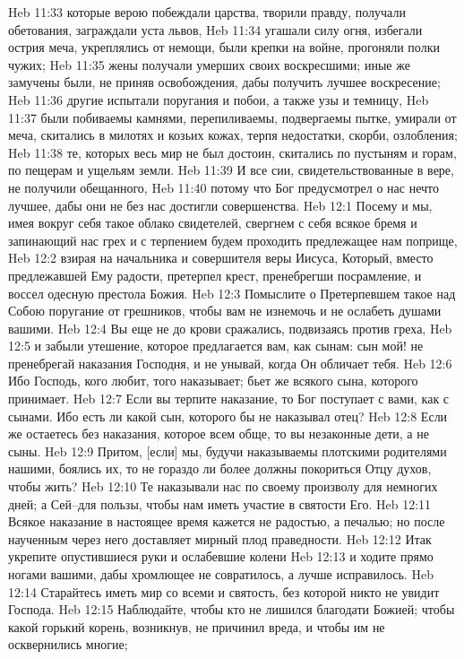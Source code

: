 Heb 11:33  которые верою побеждали царства, творили правду, получали обетования, заграждали уста львов,
Heb 11:34  угашали силу огня, избегали острия меча, укреплялись от немощи, были крепки на войне, прогоняли полки чужих;
Heb 11:35  жены получали умерших своих воскресшими; иные же замучены были, не приняв освобождения, дабы получить лучшее воскресение;
Heb 11:36  другие испытали поругания и побои, а также узы и темницу,
Heb 11:37  были побиваемы камнями, перепиливаемы, подвергаемы пытке, умирали от меча, скитались в милотях и козьих кожах, терпя недостатки, скорби, озлобления;
Heb 11:38  те, которых весь мир не был достоин, скитались по пустыням и горам, по пещерам и ущельям земли.
Heb 11:39  И все сии, свидетельствованные в вере, не получили обещанного,
Heb 11:40  потому что Бог предусмотрел о нас нечто лучшее, дабы они не без нас достигли совершенства.
Heb 12:1  Посему и мы, имея вокруг себя такое облако свидетелей, свергнем с себя всякое бремя и запинающий нас грех и с терпением будем проходить предлежащее нам поприще,
Heb 12:2  взирая на начальника и совершителя веры Иисуса, Который, вместо предлежавшей Ему радости, претерпел крест, пренебрегши посрамление, и воссел одесную престола Божия.
Heb 12:3  Помыслите о Претерпевшем такое над Собою поругание от грешников, чтобы вам не изнемочь и не ослабеть душами вашими.
Heb 12:4  Вы еще не до крови сражались, подвизаясь против греха,
Heb 12:5  и забыли утешение, которое предлагается вам, как сынам: сын мой! не пренебрегай наказания Господня, и не унывай, когда Он обличает тебя.
Heb 12:6  Ибо Господь, кого любит, того наказывает; бьет же всякого сына, которого принимает.
Heb 12:7  Если вы терпите наказание, то Бог поступает с вами, как с сынами. Ибо есть ли какой сын, которого бы не наказывал отец?
Heb 12:8  Если же остаетесь без наказания, которое всем обще, то вы незаконные дети, а не сыны.
Heb 12:9  Притом, [если] мы, будучи наказываемы плотскими родителями нашими, боялись их, то не гораздо ли более должны покориться Отцу духов, чтобы жить?
Heb 12:10  Те наказывали нас по своему произволу для немногих дней; а Сей--для пользы, чтобы нам иметь участие в святости Его.
Heb 12:11  Всякое наказание в настоящее время кажется не радостью, а печалью; но после наученным через него доставляет мирный плод праведности.
Heb 12:12  Итак укрепите опустившиеся руки и ослабевшие колени
Heb 12:13  и ходите прямо ногами вашими, дабы хромлющее не совратилось, а лучше исправилось.
Heb 12:14  Старайтесь иметь мир со всеми и святость, без которой никто не увидит Господа.
Heb 12:15  Наблюдайте, чтобы кто не лишился благодати Божией; чтобы какой горький корень, возникнув, не причинил вреда, и чтобы им не осквернились многие;

